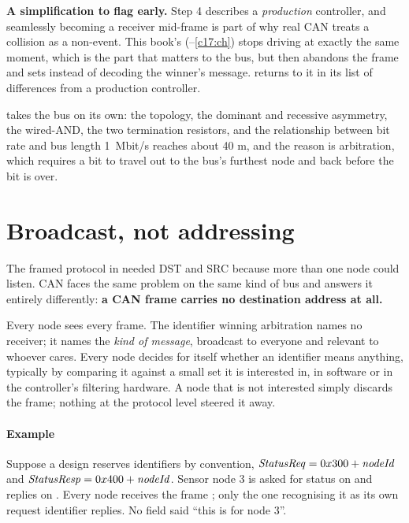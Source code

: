 \begin{aside}
\textbf{A simplification to flag early.} Step 4 describes a \emph{production} controller, and
seamlessly becoming a receiver mid-frame is part of why real CAN treats a collision as a
non-event. This book's  (--\ref{c17:ch}) stops driving at
exactly the same moment, which is the part that matters to the bus, but then abandons the frame and
sets  instead of decoding the winner's message.  returns to it in
its list of differences from a production controller.
\end{aside}

 takes the bus on its own: the topology, the dominant and recessive asymmetry, the
wired-AND, the two termination resistors, and the relationship between bit rate and bus length
\textemdash{} 1~Mbit/s reaches about 40 m, and the reason is arbitration, which requires a bit to
travel out to the bus's furthest node and back before the bit is over.

\section{Broadcast, not addressing}
\label{c10:sec:broadcast}

The framed protocol in  needed DST and SRC because more than one node could
listen. CAN faces the same problem on the same kind of bus and answers it entirely differently:
\textbf{a CAN frame carries no destination address at all.}

Every node sees every frame. The identifier winning arbitration names no receiver; it names the
\emph{kind of message}, broadcast to everyone and relevant to whoever cares. Every node decides for
itself whether an identifier means anything, typically by comparing it against a small set it is
interested in, in software or in the controller's filtering hardware. A node that is not interested
simply discards the frame; nothing at the protocol level steered it away.

\paragraph{Example}
Suppose a design reserves identifiers by convention,
$\mathit{StatusReq} = \code{0x300} + \mathit{nodeId}$ and
$\mathit{StatusResp} = \code{0x400} + \mathit{nodeId}$. Sensor node 3 is asked for status on
 and replies on . Every node receives the frame ; only the one
recognising it as its own request identifier replies. No field said ``this is for node 3''.

